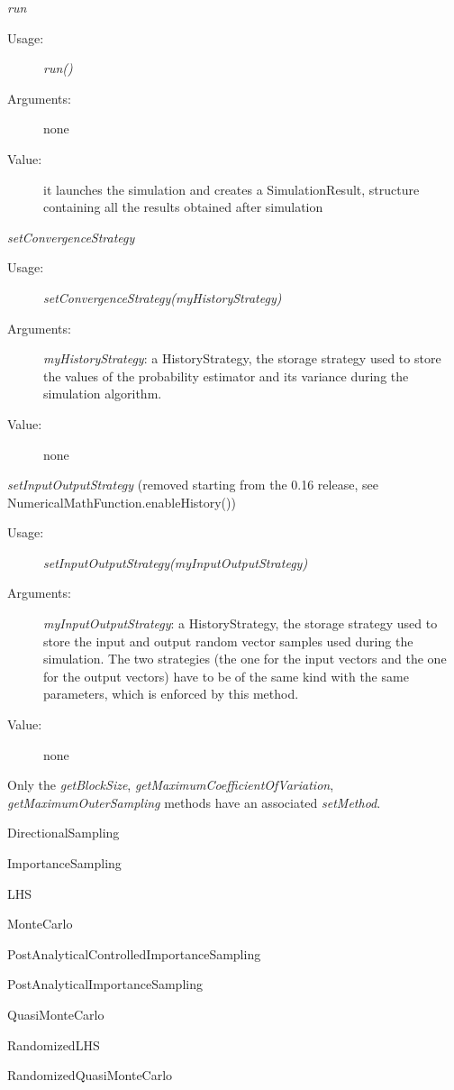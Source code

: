 \begin{description}
\begin{description}
\item \textit{run}
\begin{description}
\item[Usage:] \textit{run()}
\item[Arguments:] none
\item[Value:]  it launches the simulation and creates a SimulationResult, structure containing all the results obtained after simulation
\end{description}
\bigskip

\item \textit{setConvergenceStrategy}
\begin{description}
\item[Usage:] \textit{setConvergenceStrategy(myHistoryStrategy)}
\item[Arguments:] \textit{myHistoryStrategy}: a HistoryStrategy, the storage strategy used to store the values of the probability estimator and its variance during the simulation algorithm.
\item[Value:]  none
\end{description}
\bigskip

\item \textit{setInputOutputStrategy} (removed starting from the 0.16 release, see NumericalMathFunction.enableHistory())
\begin{description}
\item[Usage:] \textit{setInputOutputStrategy(myInputOutputStrategy)}
\item[Arguments:] \textit{myInputOutputStrategy}: a HistoryStrategy, the storage strategy used to store the input and output random vector samples used during the simulation. The two strategies (the one for the input vectors and the one for the output vectors) have to be of the same kind with the same parameters, which is enforced by this method.
\item[Value:]  none
\end{description}
\bigskip

Only the \textit{getBlockSize}, \textit{getMaximumCoefficientOfVariation},\\
\textit{getMaximumOuterSampling} methods have an associated \textit{setMethod}.

\item[Derivative Classes :] \rule{0pt}{1em}
\begin{description}
\item DirectionalSampling
\item ImportanceSampling
\item LHS
\item MonteCarlo
\item PostAnalyticalControlledImportanceSampling
\item PostAnalyticalImportanceSampling
\item QuasiMonteCarlo
\item RandomizedLHS
\item RandomizedQuasiMonteCarlo
\end{description}

\end{description}
\end{description}

